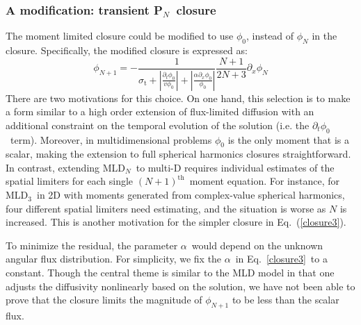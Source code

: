 \documentclass[review]{elsarticle}
\newcommand{\pn}{P$_N$}
\newcommand{\dn}{D$_N$}
\newcommand{\ppz}{\partial_x}%
\newcommand{\psii}[1]{\phi_\ensuremath{{#1}}}
\begin{document}
\subsubsection{A modification: transient \pn\ closure}
The moment limited closure could be modified to use $\psii{0}$, instead of $\psii{N}$ in the closure. Specifically, the modified closure is expressed as:
\begin{equation}\label{closure3}
\psii{N+1}=-\frac{1}{\sigma_\mathrm{t}+\displaystyle\left|\frac{\partial_t\psii{0}}{v\psii{0}}\right|+\left|\frac{\alpha\partial_x\psii{0}}{\psii{0}}\right|}\frac{N+1}{2N+3}\ppz\psii{N}
\end{equation}
There are two motivations for this choice. On one hand, this selection is to make a form similar to  %
a high order extension of flux-limited diffusion with an additional constraint on the temporal evolution of the solution (i.e. the $\partial_t\psii{0}$~term). Moreover, in multidimensional problems $\psii{0}$ is the only moment that is a scalar, making the extension to full spherical harmonics closures straightforward. {In contrast, extending ML\dn\ to multi-D requires individual estimates of the spatial limiters for each single $(N+1)^\mathrm{th}$\ moment equation. For instance, for MLD$_3$\ in 2D with moments generated from complex-value spherical harmonics, four different spatial limiters need estimating, and the situation is worse as $N$ is increased. This is another motivation for the simpler closure in Eq.~(\ref{closure3}).}%

To minimize the residual, the parameter $\alpha$\ would depend on the unknown angular flux distribution. For simplicity, we fix the $\alpha$~in Eq.~\eqref{closure3}~to a constant. %
Though the central theme is similar to the MLD model in that one adjusts the diffusivity nonlinearly based on the solution, we have not been able to prove that the closure limits the magnitude of $\phi_{N+1}$ to be less than the scalar flux. %
\end{document}
